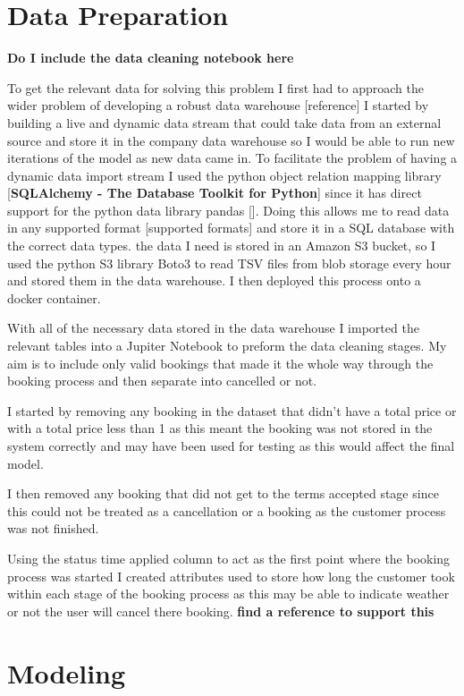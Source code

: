 \section{Data Preparation}
\textbf{Do I include the data cleaning notebook here}

To get the relevant data for solving this problem I first had to approach the wider problem of developing a robust data warehouse [reference] I started by building a live and dynamic data stream that could take data from an external source and store it in the company data warehouse so I would be able to run new iterations of the model as new data came in. To facilitate the problem of having a dynamic data import stream I used the python object relation mapping library [\textbf{SQLAlchemy - The Database Toolkit for Python}] since it has direct support for the python data library pandas []. Doing this allows me to read data in any supported format [supported formats] and store it in a SQL database with the correct data types. the data I need is stored in an Amazon S3 bucket, so I used the python S3 library Boto3 to read TSV files from blob storage every hour and stored them in the data warehouse. I then deployed this process onto a docker container.

\vspace{5mm}

With all of the necessary data stored in the data warehouse I imported the relevant tables into a Jupiter Notebook to preform the data cleaning stages. My aim is to include only valid bookings that made it the whole way through the booking process and then separate into cancelled or not.

I started by removing any booking in the dataset that didn't have a total price or with a total price less than 1 as this meant the booking was not stored in the system correctly and may have been used for testing as this would affect the final model. 

I then removed any booking that did not get to the terms accepted stage since this could not be treated as a cancellation or a booking as the customer process was not finished.

Using the status time applied column to act as the first point where the booking process was started I created attributes used to store how long the customer took within each stage of the booking process as this may be able to indicate weather or not the user will cancel there booking.  \textbf{find a reference to support this}

\section{Modeling}


